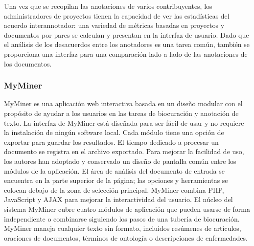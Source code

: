 Una vez que se recopilan las anotaciones de varios contribuyentes, los administradores de proyectos tienen la capacidad de ver las estadísticas del acuerdo interannotador: una variedad de métricas basadas en proyectos y documentos por pares se calculan y presentan en la interfaz de usuario.
Dado que el análisis de los desacuerdos entre los anotadores es una tarea común, también se proporciona una interfaz para una comparación lado a lado de las anotaciones de los documentos.

\subsubsection*{MyMiner}

MyMiner es una aplicación web interactiva basada en un diseño modular con el propósito de ayudar a los usuarios en las tareas de biocuración y anotación de texto.
La interfaz de MyMiner está diseñada para ser fácil de usar y no requiere la instalación de ningún software local.
Cada módulo tiene una opción de exportar para guardar los resultados.
El tiempo dedicado a procesar un documento se registra en el archivo exportado.
Para mejorar la facilidad de uso, los autores han adoptado y conservado un diseño de pantalla común entre los módulos de la aplicación.
El área de análisis del documento de entrada se encuentra en la parte superior de la página; las opciones y herramientas se colocan debajo de la zona de selección principal.
MyMiner combina PHP, JavaScript y AJAX para mejorar la interactividad del usuario. El núcleo del sistema MyMiner cubre cuatro módulos de aplicación que pueden usarse de forma independiente o combinarse siguiendo los pasos de una tubería de biocuración.
MyMiner maneja cualquier texto sin formato, incluidos resúmenes de artículos, oraciones de documentos, términos de ontología o descripciones de enfermedades.


